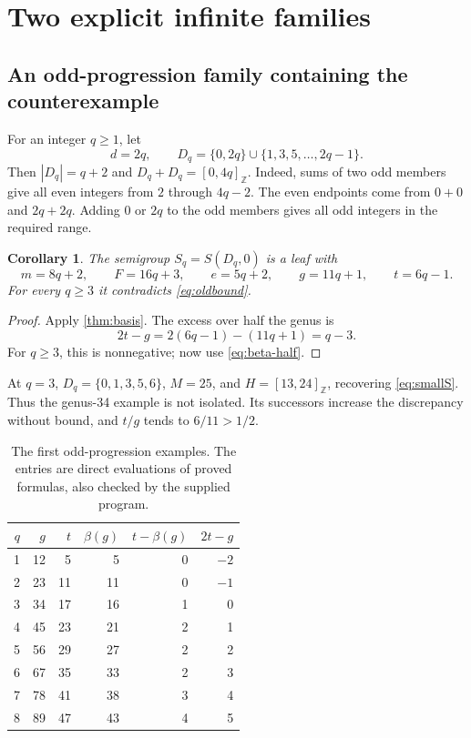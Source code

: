 \documentclass[11pt,letterpaper]{article}
\numberwithin{equation}{section}
\newtheorem{corollary}[theorem]{Corollary}
\theoremstyle{definition}
\theoremstyle{remark}
\newcommand{\Z}{\mathbb Z}
\newcommand{\ints}[2]{[#1,#2]_{\Z}}
\newcommand{\conjb}{\beta}
\begin{document}
\section{Two explicit infinite families}\label{sec:families}

\subsection{An odd-progression family containing the counterexample}

For an integer $q\ge1$, let
\begin{equation}\label{eq:oddD}
 d=2q,\qquad D_q=\{0,2q\}\cup\{1,3,5,\ldots,2q-1\}.
\end{equation}
Then $|D_q|=q+2$ and $D_q+D_q=\ints{0}{4q}$. Indeed, sums of two odd
members give all even integers from $2$ through $4q-2$. The even endpoints
come from $0+0$ and $2q+2q$. Adding $0$ or $2q$ to the odd members gives
all odd integers in the required range.

\begin{corollary}\label{cor:odd}
The semigroup $S_q=S(D_q,0)$ is a leaf with
\begin{equation}\label{eq:oddparams}
 m=8q+2,\qquad F=16q+3,\qquad e=5q+2,\qquad
 g=11q+1,\qquad t=6q-1.
\end{equation}
For every $q\ge3$ it contradicts \eqref{eq:oldbound}.
\end{corollary}

\begin{proof}
Apply \cref{thm:basis}. The excess over half the genus is
\[
 2t-g=2(6q-1)-(11q+1)=q-3.
\]
For $q\ge3$, this is nonnegative; now use \eqref{eq:beta-half}.
\end{proof}

At $q=3$, $D_q=\{0,1,3,5,6\}$, $M=25$, and
$H=\ints{13}{24}$, recovering \eqref{eq:smallS}. Thus the genus-34 example
is not isolated. Its successors increase the discrepancy without bound,
and $t/g$ tends to $6/11>1/2$.

\begin{table}[htbp]
\centering
\begin{tabular}{rrrrrr}
\toprule
$q$ & $g$ & $t$ & $\conjb(g)$ & $t-\conjb(g)$ & $2t-g$\\
\midrule
1&12&5&5&0&$-2$\\
2&23&11&11&0&$-1$\\
3&34&17&16&1&0\\
4&45&23&21&2&1\\
5&56&29&27&2&2\\
6&67&35&33&2&3\\
7&78&41&38&3&4\\
8&89&47&43&4&5\\
\bottomrule
\end{tabular}
\caption{The first odd-progression examples. The entries are direct evaluations
of proved formulas, also checked by the supplied program.}\label{tab:odd}
\end{table}
\end{document}
